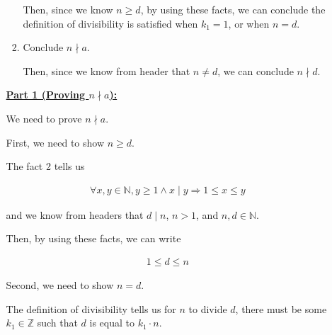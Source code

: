\documentclass[12pt]{article}
\begin{document}
\begin{enumerate}[a.]
\begin{mdframed}
\begin{enumerate}[1.]
\begin{enumerate}[1.]
\begin{mdframed}
            \bigskip

            Then, since we know $n \geq d$, by using these facts, we can conclude
            the definition of divisibility is satisfied when $k_1 = 1$, or
            when $n = d$.

            \end{mdframed}

            \item Conclude $n \nmid a$.

            \begin{mdframed}
            Then, since we know from header that $n \neq d$, we can conclude
            $n \nmid d$.
            \end{mdframed}
        \end{enumerate}

        \begin{mdframed}

        \underline{\textbf{Part 1 (Proving $n \nmid a$):}}

        \bigskip

        We need to prove $n \nmid a$.

        \bigskip

        First, we need to show $n \geq d$.

        \bigskip

        The fact 2 tells us

        \begin{align}
            \forall x,y \in \mathbb{N}, y \geq 1 \land x \mid y \Rightarrow 1 \leq x \leq y
        \end{align}

        and we know from headers that $d \mid n$, $n > 1$, and $n,d \in \mathbb{N}$.

        \bigskip

        Then, by using these facts, we can write

        \begin{align}
            1 \leq d \leq n
        \end{align}

        \bigskip

        Second, we need to show $n = d$.

        \bigskip

        The definition of divisibility tells us for $n$ to
        divide $d$, there must be some $k_1 \in \mathbb{Z}$ such that
        $d$ is equal to $k_1 \cdot n$.

        \bigskip


\end{mdframed}
\end{enumerate}
\end{mdframed}
\end{enumerate}
\end{document}
